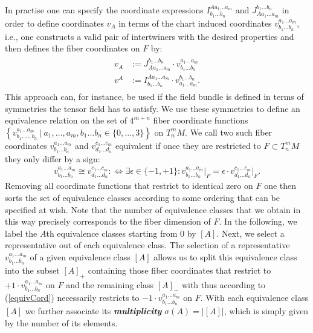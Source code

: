 In practise one can specify the coordinate expressions $I^{A a_1 ... a_m}_{b_1 ... b_n}$ and $J^{b_1 ... b_n}_{A a_1 ... a_m}$ in order to define coordinates $v_A$ in terms of the chart induced coordinates $v^{a_1 ... a_m}_{b_1 ... b_n}$, i.e., one constructs a valid pair of intertwiners with the desired properties and then defines the fiber coordinates on $F$ by:
\begin{align}
    \begin{aligned}
    v_A &:= J^{b_1 ... b_n}_{A a_1 ... a_m} \cdot v^{a_1 ... a_m}_{b_1 ... b_n}\\
    v^A &:= I^{A a_1 ... a_m}_{b_1 ... b_n} \cdot  v^{b_1 ... b_n}_{a_1 ... a_m} .
    \end{aligned}
\end{align}
This approach can, for instance, be used if the field bundle is defined in terms of symmetries the tensor field has to satisfy. We use these symmetries to define an equivalence relation on the set of $4^{m+n}$ fiber coordinate functions $\left \{ v^{a_1 ... a_m}_{b_1, ..., b_n} \ \big \vert \  a_1,...,a_m,b_1...b_n \in \{0,...,3 \} \right \}$ on $T^m_nM$. We call two such fiber coordinates $v^{a_1 ... a_m}_{b_1 ... b_n}$ and $v^{c_1 ... c_m}_{d_1 ... d_n}$ equivalent if once they are restricted to $F \subset T^m_nM$ they only differ by a sign:
\begin{align}\label{equivCord}
v^{a_1 ... a_m}_{b_1 ... b_n} \cong v^{c_1 ... c_m}_{d_1 ... d_n} : \iff \exists \epsilon \in \{-1,+1 \} : v^{a_1 ... a_m}_{b_1 ... b_n} \big \vert _F = \epsilon \cdot  v^{c_1 ... c_m}_{d_1 ... d_n} \big \vert_F.
\end{align}
Removing all coordinate functions that restrict to identical zero on $F$ one then sorts the set of equivalence classes according to some ordering that can be specified at wish.  Note that the number of equivalence classes that we obtain in this way precisely corresponds to the fiber dimension of $F$. In the following, we label the $A$th equivalence classes starting from 0 by $[A]$. Next, we select a representative out of each equivalence class.  The selection of a representative $v^{a_1 ... a_m}_{b_1 ... b_n}$ of a given equivalence class $[A]$ allows us to split this equivalence class into the subset $[A]_+$ containing those fiber coordinates that restrict to $+1 \cdot v^{a_1 ... a_m}_{b_1 ... b_n}$  on $F$ and the remaining class $[A]_-$ with thus according to (\ref{equivCord}) necessarily restricts to $-1 \cdot v^{a_1 ... a_m}_{b_1 ... b_n}$ on $F$.
With each equivalence class $[A]$ we further associate its \textbf{\textit{multiplicity}} $\sigma(A) = \vert [A] \vert$, which is simply given by the number of its elements.

